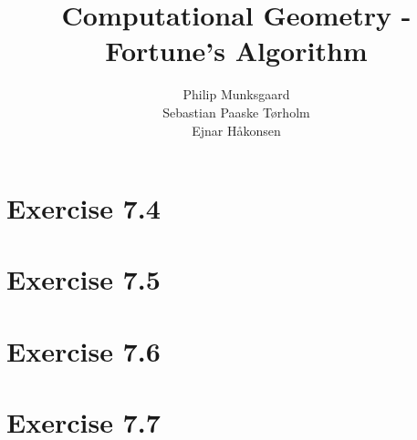 \documentclass[11pt,a4paper]{article}
\title{Computational Geometry - Fortune's Algorithm}
\author{Philip Munksgaard \\ Sebastian Paaske Tørholm \\ Ejnar Håkonsen}
\begin{document}
\maketitle

\section{Exercise 7.4}


\section{Exercise 7.5}


\section{Exercise 7.6}


\section{Exercise 7.7}
\end{document}
